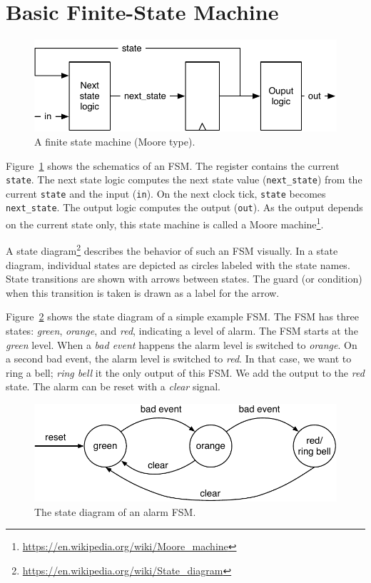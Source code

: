 \documentclass[%
    10pt,
    headinclude, footexclude,
    openright, %
    notitlepage,
    cleardoubleempty,
    headsepline,
    pointlessnumbers,
    bibtotoc, idxtotoc,
    ]{scrbook}
\newcommand{\code}[1]{{\small{\texttt{#1}}}}
\newcommand{\scale}{0.7}
\newcommand{\myref}[2]{\href{#1}{#2}}
\renewcommand{\myref}[2]{{#2}{\footnote{\url{#1}}}}
\begin{document}
\section{Basic Finite-State Machine}

\begin{figure}
  \centering
  \includegraphics[scale=\scale]{figures/fsm}
  \caption{A finite state machine (Moore type).}
  \label{fig:fsm}
\end{figure}

Figure~\ref{fig:fsm} shows the schematics of an FSM. The register contains the current \code{state}.
The next state logic computes the next state value (\code{next\_state})
from the current \code{state} and the input (\code{in}).
On the next clock tick, \code{state} becomes \code{next\_state}.
The output logic computes the output (\code{out}). As the output depends on the current
state only, this state machine is called a
\myref{https://en.wikipedia.org/wiki/Moore_machine}{Moore machine}.

A \myref{https://en.wikipedia.org/wiki/State_diagram}{state diagram}
describes the behavior of such an FSM visually.
In a state diagram, individual states are depicted as circles labeled
with the state names.
State transitions are shown with arrows between states.
The guard (or condition) when this transition is taken is drawn as a label
for the arrow.

Figure~\ref{fig:diag-moore} shows the state diagram of a simple example FSM.
The FSM has three states: \emph{green}, \emph{orange}, and \emph{red},
indicating a level of alarm. The FSM starts at the \emph{green} level.
When a \emph{bad event} happens the alarm level is switched to \emph{orange}.
On a second bad event, the alarm level is switched to \emph{red}.
In that case, we want to ring a bell; \emph{ring bell} it the only output of this FSM.
We add the output to the \emph{red} state.
The alarm can be reset with a \emph{clear} signal.

\begin{figure}
  \centering
  \includegraphics[scale=\scale]{figures/state-diag-moore}
  \caption{The state diagram of an alarm FSM.}
  \label{fig:diag-moore}
\end{figure}
\end{document}
